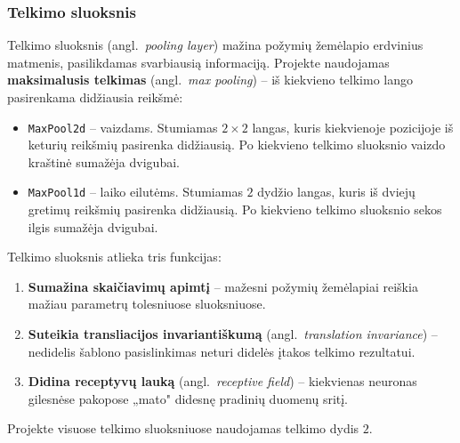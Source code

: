 \subsubsection{Telkimo sluoksnis}
\label{subsubsec:telkimo_sluoksnis}

Telkimo sluoksnis (angl.~\textit{pooling layer}) mažina požymių žemėlapio erdvinius matmenis, pasilikdamas svarbiausią informaciją. Projekte naudojamas \textbf{maksimalusis telkimas} (angl.~\textit{max pooling}) – iš kiekvieno telkimo lango pasirenkama didžiausia reikšmė:

\begin{itemize}
    \item \texttt{MaxPool2d} – vaizdams. Stumiamas $2 \times 2$ langas, kuris kiekvienoje pozicijoje iš keturių reikšmių pasirenka didžiausią. Po kiekvieno telkimo sluoksnio vaizdo kraštinė sumažėja dvigubai.
    \item \texttt{MaxPool1d} – laiko eilutėms. Stumiamas $2$ dydžio langas, kuris iš dviejų gretimų reikšmių pasirenka didžiausią. Po kiekvieno telkimo sluoksnio sekos ilgis sumažėja dvigubai.
\end{itemize}

Telkimo sluoksnis atlieka tris funkcijas:
\begin{enumerate}
    \item \textbf{Sumažina skaičiavimų apimtį} – mažesni požymių žemėlapiai reiškia mažiau parametrų tolesniuose sluoksniuose.
    \item \textbf{Suteikia transliacijos invariantiškumą} (angl.~\textit{translation invariance}) – nedidelis šablono pasislinkimas neturi didelės įtakos telkimo rezultatui.
    \item \textbf{Didina receptyvų lauką} (angl.~\textit{receptive field}) – kiekvienas neuronas gilesnėse pakopose „mato" didesnę pradinių duomenų sritį.
\end{enumerate}

Projekte visuose telkimo sluoksniuose naudojamas telkimo dydis $2$.
